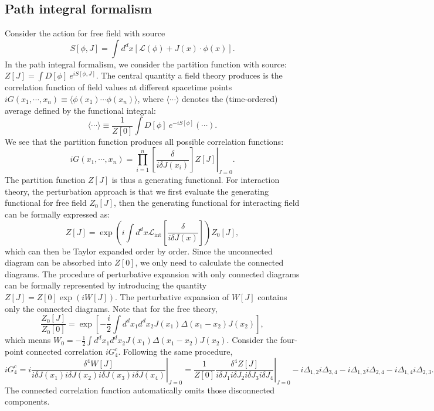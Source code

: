 \documentclass[aps,prb,superscriptaddress,nofootinbib]{revtex4}
\begin{document}
\subsection{Path integral formalism}
Consider the action for free field with source
\begin{equation}
	S[\phi,J]
	= \int d^dx\left[\mathcal{L}(\phi) + J(x)\cdot\phi(x) \right].
\end{equation}
In the path integral formalism, we consider the partition function with source: $Z[J] = \int D[\phi]\ e^{iS[\phi,J]}$.
The central quantity a field theory produces is the correlation function of field values at different spacetime points $iG(x_1,\cdots,x_n) \equiv \langle \phi(x_1)\cdots \phi(x_n)\rangle$, where $\langle \cdots \rangle$ denotes the (time-ordered) average defined by the functional integral:
\begin{equation}
	\langle \cdots \rangle \equiv \frac{1}{Z[0]}\int D[\phi]\ e^{-iS[\phi]} (\cdots).
\end{equation}
We see that the partition function produces all possible correlation functions:
\begin{equation}
	iG(x_1,\cdots,x_n) = \left. \prod_{i=1}^n \left[\frac{\delta}{i\delta J(x_i)}\right] Z[J] \right|_{J=0}.
\end{equation}
The partition function $Z[J]$ is thus a generating functional.
For interaction theory, the perturbation approach is that we first evaluate the generating functional for free field $Z_0[J]$, then the generating functional for interacting field can be formally expressed as:
\begin{equation}
	Z[J] = \exp\left(i\int d^dx \mathcal{L}_{\mathrm{int}}\left[\frac{\delta}{i\delta J(x)}\right]\right)Z_0[J],
\end{equation}
which can then be Taylor expanded order by order.
Since the unconnected diagram can be absorbed into $Z[0]$, we only need to calculate the connected diagrams.
The procedure of perturbative expansion with only connected diagrams can be formally represented by introducing the quantity $Z[J] = Z[0]\exp\left(i W[J]\right)$.
The perturbative expansion of $W[J]$ contains only the connected diagrams.
Note that for the free theory,
\begin{equation*}
	\frac{Z_0[J]}{Z_0[0]} = \exp\left[-\frac{i}{2}\int d^d x_1 d^d x_2 J(x_1) \Delta(x_1-x_2)J(x_2)\right],
\end{equation*}
which means $W_0 = -\frac{1}{2}\int d^d x_1 d^d x_2 J(x_1) \Delta(x_1-x_2)J(x_2)$.
Consider the four-point connected correlation $iG^c_4$.
Following the same procedure,
\begin{equation*}
	iG^c_4 
	= i\left.\frac{\delta^4 W[J]}{i\delta J(x_1)i\delta J(x_2)i\delta J(x_3)i\delta J(x_4)}\right|_{J=0} 
	= \frac{1}{Z[0]}\left.\frac{\delta^4 Z[J]}{i\delta J_1 i\delta J_2 i\delta J_3 i\delta J_4}\right|_{J=0} 
	-i\Delta_{1,2} i\Delta_{3,4} -i\Delta_{1,3} i\Delta_{2,4} -i\Delta_{1,4} i\Delta_{2,3}.
\end{equation*}
The connected correlation function automatically omits those disconnected components.
\end{document}
